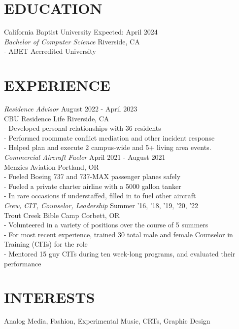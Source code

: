 \documentclass[line,margin]{res}
\begin{document}
\begin{resume}
\section{EDUCATION}
                    California Baptist University \hfill Expected: April 2024\\
                    {\sl Bachelor of Computer Science} \hfill Riverside, CA\\
                    - ABET Accredited University\\
                    
\section{EXPERIENCE}
                    {\sl Residence Advisor} \hfill August 2022 - April 2023\\
                    CBU Residence Life \hfill Riverside, CA\\
                    - Developed personal relationships with 36 residents\\
                    - Performed roommate conflict mediation and other incident response\\
                    - Helped plan and execute 2 campus-wide and 5+ living area events.\\

                    {\sl Commercial Aircraft Fueler} \hfill April 2021 - August 2021\\
                    Menzies Aviation \hfill Portland, OR\\
                    - Fueled Boeing 737 and 737-MAX passenger planes safely\\
                    - Fueled a private charter airline with a 5000 gallon tanker\\
                    - In rare occasions if understaffed, filled in to fuel other aircraft\\

                    {\sl Crew, CIT, Counselor, Leadership} \hfill Summer '16, '18, '19, '20, '22 \\
                    Trout Creek Bible Camp \hfill Corbett, OR\\
                    - Volunteered in a variety of positions over the course of 5 summers\\
                    - For most recent experience, trained 30 total male and female Counselor in Training (CITs) for the role\\
                    - Mentored 15 guy CITs during ten week-long programs, and evaluated their performance

\section{INTERESTS}
                    Analog Media, Fashion, Experimental Music, CRTs, Graphic Design
                   
\end{resume}
\end{document}
